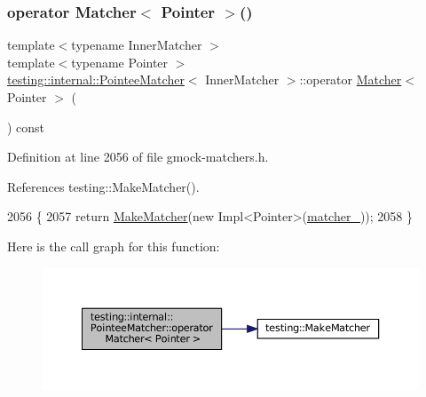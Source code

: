 \mbox{\label{classtesting_1_1internal_1_1PointeeMatcher_adec012cd8d3fa166ee89236545a57772}} 
\subsubsection{\texorpdfstring{operator Matcher$<$ Pointer $>$()}{operator Matcher< Pointer >()}}
{\footnotesize\ttfamily template$<$typename Inner\+Matcher $>$ \\
template$<$typename Pointer $>$ \\
\hyperlink{classtesting_1_1internal_1_1PointeeMatcher}{testing\+::internal\+::\+Pointee\+Matcher}$<$ Inner\+Matcher $>$\+::operator \hyperlink{classtesting_1_1Matcher}{Matcher}$<$ Pointer $>$ (\begin{DoxyParamCaption}{ }\end{DoxyParamCaption}) const\hspace{0.3cm}{\ttfamily [inline]}}



Definition at line 2056 of file gmock-\/matchers.\+h.



References testing\+::\+Make\+Matcher().


\begin{DoxyCode}
2056                                     \{
2057     \textcolor{keywordflow}{return} \hyperlink{namespacetesting_a37fd8029ac00e60952440a3d9cca8166}{MakeMatcher}(\textcolor{keyword}{new} Impl<Pointer>(\hyperlink{classtesting_1_1internal_1_1PointeeMatcher_aa429edbc73c0350807d9b0ffcc6ab922}{matcher\_}));
2058   \}
\end{DoxyCode}
Here is the call graph for this function\+:
\nopagebreak
\begin{figure}[H]
\begin{center}
\leavevmode
\includegraphics[width=350pt]{classtesting_1_1internal_1_1PointeeMatcher_adec012cd8d3fa166ee89236545a57772_cgraph}
\end{center}
\end{figure}


